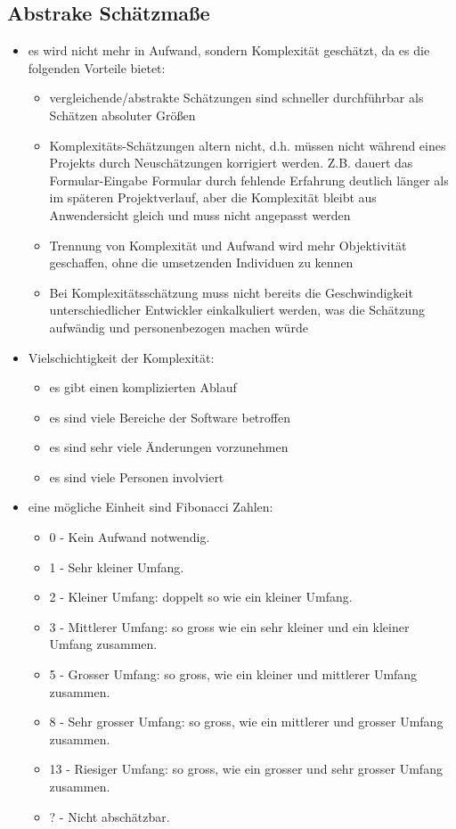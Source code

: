\subsection{Abstrake Schätzmaße}
\begin{itemize}
  \item es wird nicht mehr in Aufwand, sondern Komplexität geschätzt, da es die folgenden Vorteile
    bietet:
    \begin{itemize}
      \item vergleichende/abstrakte Schätzungen sind schneller durchführbar als Schätzen
        absoluter Größen
      \item Komplexitäts-Schätzungen altern nicht, d.h. müssen nicht während eines Projekts
        durch Neuschätzungen korrigiert werden. Z.B. dauert das Formular-Eingabe Formular durch
        fehlende Erfahrung deutlich länger als im späteren Projektverlauf, aber die
        Komplexität bleibt aus Anwendersicht gleich und muss nicht angepasst werden
      \item Trennung von Komplexität und Aufwand wird mehr Objektivität geschaffen, ohne die
        umsetzenden Individuen zu kennen
      \item Bei Komplexitätsschätzung muss nicht bereits die Geschwindigkeit
        unterschiedlicher Entwickler einkalkuliert werden, was die Schätzung aufwändig und
        personenbezogen machen würde
    \end{itemize}
  \item Vielschichtigkeit der Komplexität:
    \begin{itemize}
      \item es gibt einen komplizierten Ablauf
      \item es sind viele Bereiche der Software betroffen
      \item es sind sehr viele Änderungen vorzunehmen
      \item es sind viele Personen involviert
    \end{itemize}
  \item eine mögliche Einheit sind Fibonacci Zahlen:
    \begin{itemize}
      \item 0 - Kein Aufwand notwendig.
      \item 1 - Sehr kleiner Umfang.
      \item 2 - Kleiner Umfang: doppelt so wie ein kleiner Umfang.
      \item 3 - Mittlerer Umfang: so gross wie ein sehr kleiner und ein kleiner Umfang zusammen.
      \item 5 - Grosser Umfang: so gross, wie ein kleiner und mittlerer Umfang zusammen.
      \item 8 - Sehr grosser Umfang: so gross, wie ein mittlerer und grosser Umfang zusammen.
      \item 13 - Riesiger Umfang: so gross, wie ein grosser und sehr grosser Umfang zusammen.
      \item ? - Nicht abschätzbar.
    \end{itemize}
\end{itemize}


